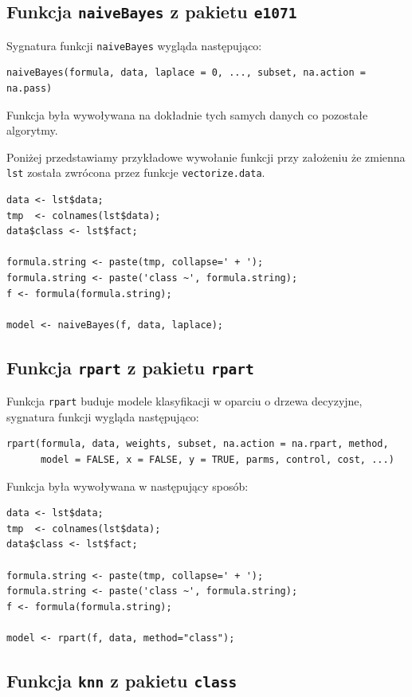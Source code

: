 \documentclass[a4paper,12pt]{article}
\begin{document}
	\subsection{Funkcja \texttt{naiveBayes} z pakietu \texttt{e1071}}
	
	Sygnatura funkcji \texttt{naiveBayes} wygląda następująco:
\begin{verbatim}
naiveBayes(formula, data, laplace = 0, ..., subset, na.action = na.pass)
\end{verbatim}
	Funkcja była wywoływana na dokładnie tych samych danych co
	pozostałe algorytmy. 
	
	Poniżej przedstawiamy przykładowe 
	wywołanie funkcji przy założeniu że zmienna \texttt{lst}
	została zwrócona przez funkcje \texttt{vectorize.data}.
\begin{verbatim}
data <- lst$data;
tmp  <- colnames(lst$data);
data$class <- lst$fact;

formula.string <- paste(tmp, collapse=' + ');
formula.string <- paste('class ~', formula.string);
f <- formula(formula.string);

model <- naiveBayes(f, data, laplace);
\end{verbatim}
	
	\subsection{Funkcja \texttt{rpart} z pakietu \texttt{rpart}}
	
	Funkcja \texttt{rpart} buduje modele klasyfikacji w oparciu 
	o drzewa decyzyjne, sygnatura funkcji wygląda następująco:
\begin{verbatim}
rpart(formula, data, weights, subset, na.action = na.rpart, method,
      model = FALSE, x = FALSE, y = TRUE, parms, control, cost, ...)
\end{verbatim}
	
	Funkcja była wywoływana w następujący sposób:
\begin{verbatim}
data <- lst$data;
tmp  <- colnames(lst$data);
data$class <- lst$fact;

formula.string <- paste(tmp, collapse=' + ');
formula.string <- paste('class ~', formula.string);
f <- formula(formula.string);

model <- rpart(f, data, method="class");
\end{verbatim}

	\subsection{Funkcja \texttt{knn} z pakietu \texttt{class}}
	
\end{document}
